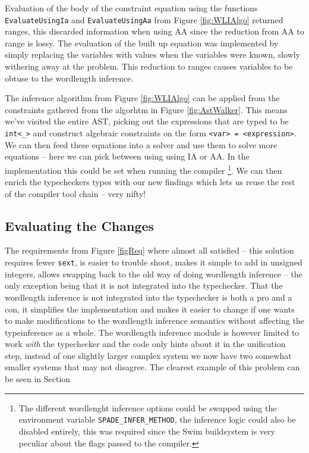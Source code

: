 Evaluation of the body of the constraint equation using the functions \verb+EvaluateUsingIa+ and \verb+EvaluateUsingAa+ from Figure \ref{fig:WLIAlgo} returned ranges, this discarded information when using AA since the reduction from AA to range is lossy. The evaluation of the built up equation was implemented by simply replacing the variables with values when the variables were known, slowly withering away at the problem. This reduction to ranges causes variables to be obtuse to the wordlength inference.

The inference algorithm from Figure \ref{fig:WLIAlgo} can be applied from the constraints gathered from the algorhtm in Figure \ref{fig:AstWalker}. This means we've visited the entire AST, picking out the expressions that are typed to be \verb+int<_>+ and construct algebraic constraints on the form \verb+<var> = <expression>+. We can then feed these equations into a solver and use them to solve more equations -- here we can pick between using using IA or AA. In the implementation this could be set when running the compiler \cprotect\footnote{The different wordlenght inference options could be swapped using the environment variable \verb+SPADE_INFER_METHOD+, the inference logic could also be disabled entirely, this was required since the Swim buildsystem is very peculiar about the flags passed to the compiler.}. We can then enrich the typecheckers types with our new findings which lets us reuse the rest of the compiler tool chain -- very nifty!

\subsection{Evaluating the Changes}
The requirements from Figure \ref{figReq} where almost all satisfied -- this solution requires fewer \verb+sext+, is easier to trouble shoot, makes it simple to add in unsigned integers, allows swapping back to the old way of doing wordlength inference -- the only exception being that it is not integrated into the typechecker. That the wordlength inference is not integrated into the typechecker is both a pro and a con, it simplifies the implementation and makes it easier to change if one wants to make modifications to the wordlength inference semantics without affecting the typeinference as a whole. The wordlength inference module is however limited to work \textit{with} the typechecker and the code only hints about it in the unification step, instead of one slightly larger complex system we now have two somewhat smaller systems that may not disagree. The clearest example of this problem can be seen in Section \

